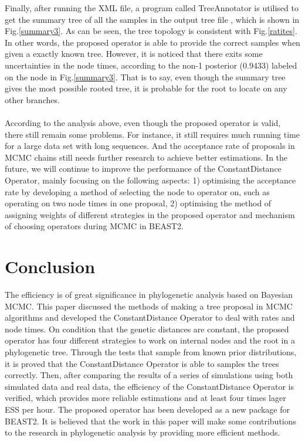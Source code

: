 \documentclass{bmcart}
\begin{document}
Finally, after running the XML file, a program called TreeAnnotator is utilised to get the summary tree of all the samples in the output tree file \cite{TreeAnnotator}, which is shown in Fig.\ref{summary3}. As can be seen, the tree topology is consistent with Fig.\ref{ratites}. In other words, the proposed operator is able to provide the correct samples when given a exactly known tree. However, it is noticed that there exits some uncertainties in the node times, according to the non-1 posterior (0.9433) labeled on the node in Fig.\ref{summary3}. That is to say, even though the summary tree gives the most possible rooted tree, it is probable for the root to locate on any other branches.
\\
\\
According to the analysis above, even though the proposed operator is valid, there still remain some problems. For instance, it still requires much running time for a large data set with long sequences. And the acceptance rate of proposals in MCMC chains still needs further research to achieve better estimations. In the future, we will continue to improve the performance of the ConstantDistance Operator, mainly focusing on the following aspects: 1) optimising the acceptance rate by developing a method of selecting the node to operator on, such as operating on two node times in one proposal, 2) optimising the method of assigning weights of different strategies in the proposed operator and mechanism of choosing operators during MCMC in BEAST2.

\section*{Conclusion}
The efficiency is of great significance in phylogenetic analysis based on Bayesian MCMC. This paper discussed the methods of making a tree proposal in MCMC algorithms and developed the ConstantDistance Operator to deal with rates and node times. On condition that the genetic distances are constant, the proposed operator has four different strategies to work on internal nodes and the root in a phylogenetic tree. Through the tests that sample from known prior distributions, it is proved that the ConstantDistance Operator is able to samples the trees correctly. Then, after comparing the results of a series of simulations using both simulated data and real data, the efficiency of the ConstantDistance Operator is verified, which provides more reliable estimations and at least four times lager ESS per hour.  The proposed operator has been developed as a new package for BEAST2. It is believed that the work in this paper will make some contributions to the research in phylogenetic analysis by providing more efficient methods.
\end{document}

